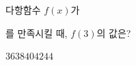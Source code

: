 다항함수 $f(x)$가 \par\smallskip{}\par\smallskip\noindent 를 만족시킬 때, $f(3)$의 값은?
\begin{choices32}{$36$}{$38$}{$40$}{$42$}{$44$}\end{choices32}
